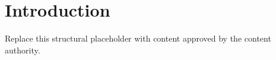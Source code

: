 \section{Introduction}

Replace this structural placeholder with content approved by the content
authority.
